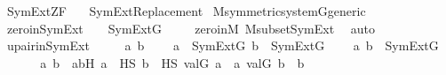 %
\begin{isabellebody}%
%
%
\isadelimtheory
%
\endisadelimtheory
%
\isatagtheory
{}\isamarkupfalse%
\ SymExt{\isacharunderscore}{\kern0pt}ZF\isanewline
\ \ \ SymExt{\isacharunderscore}{\kern0pt}Replacement\isanewline
{}%
\endisatagtheory
{\isafoldtheory}%
%
\isadelimtheory
\isanewline
%
\endisadelimtheory
\isanewline
{}\isamarkupfalse%
\ M{\isacharunderscore}{\kern0pt}symmetric{\isacharunderscore}{\kern0pt}system{\isacharunderscore}{\kern0pt}G{\isacharunderscore}{\kern0pt}generic\ \ \isanewline
\isanewline
{}\isamarkupfalse%
\ zero{\isacharunderscore}{\kern0pt}in{\isacharunderscore}{\kern0pt}SymExt\ {\isacharcolon}{\kern0pt}\ {\isachardoublequoteopen}{}\ {\isasymin}\ SymExt{\isacharparenleft}{\kern0pt}G{\isacharparenright}{\kern0pt}{\isachardoublequoteclose}\ \isanewline
%
\isadelimproof
\ \ %
\endisadelimproof
%
\isatagproof
{}\isamarkupfalse%
\ zero{\isacharunderscore}{\kern0pt}in{\isacharunderscore}{\kern0pt}M\ M{\isacharunderscore}{\kern0pt}subset{\isacharunderscore}{\kern0pt}SymExt\ \isamarkupfalse%
\ auto%
\endisatagproof
{\isafoldproof}%
%
\isadelimproof
\isanewline
%
\endisadelimproof
\isanewline
{}\isamarkupfalse%
\ upair{\isacharunderscore}{\kern0pt}in{\isacharunderscore}{\kern0pt}SymExt\ {\isacharcolon}{\kern0pt}\ \isanewline
\ \ \ a\ b\ \isanewline
\ \ \ {\isachardoublequoteopen}a\ {\isasymin}\ SymExt{\isacharparenleft}{\kern0pt}G{\isacharparenright}{\kern0pt}{\isachardoublequoteclose}\ {\isachardoublequoteopen}b\ {\isasymin}\ SymExt{\isacharparenleft}{\kern0pt}G{\isacharparenright}{\kern0pt}{\isachardoublequoteclose}\ \isanewline
\ \ \ {\isachardoublequoteopen}{\isacharbraceleft}{\kern0pt}a{\isacharcomma}{\kern0pt}\ b{\isacharbraceright}{\kern0pt}\ {\isasymin}\ SymExt{\isacharparenleft}{\kern0pt}G{\isacharparenright}{\kern0pt}{\isachardoublequoteclose}\ \isanewline
%
\isadelimproof
%
\endisadelimproof
%
\isatagproof
{}\isamarkupfalse%
\ {\isacharminus}{\kern0pt}\ \isanewline
\ \ \isamarkupfalse%
\ a{\isacharprime}{\kern0pt}\ b{\isacharprime}{\kern0pt}\ \ a{\isacharprime}{\kern0pt}b{\isacharprime}{\kern0pt}H{\isacharcolon}{\kern0pt}\ {\isachardoublequoteopen}a{\isacharprime}{\kern0pt}\ {\isasymin}\ HS{\isachardoublequoteclose}\ {\isachardoublequoteopen}b{\isacharprime}{\kern0pt}\ {\isasymin}\ HS{\isachardoublequoteclose}\ {\isachardoublequoteopen}val{\isacharparenleft}{\kern0pt}G{\isacharcomma}{\kern0pt}\ a{\isacharprime}{\kern0pt}{\isacharparenright}{\kern0pt}\ {\isacharequal}{\kern0pt}\ a{\isachardoublequoteclose}\ {\isachardoublequoteopen}val{\isacharparenleft}{\kern0pt}G{\isacharcomma}{\kern0pt}\ b{\isacharprime}{\kern0pt}{\isacharparenright}{\kern0pt}\ {\isacharequal}{\kern0pt}\ b{\isachardoublequoteclose}\ \isanewline

\end{isabellebody}
